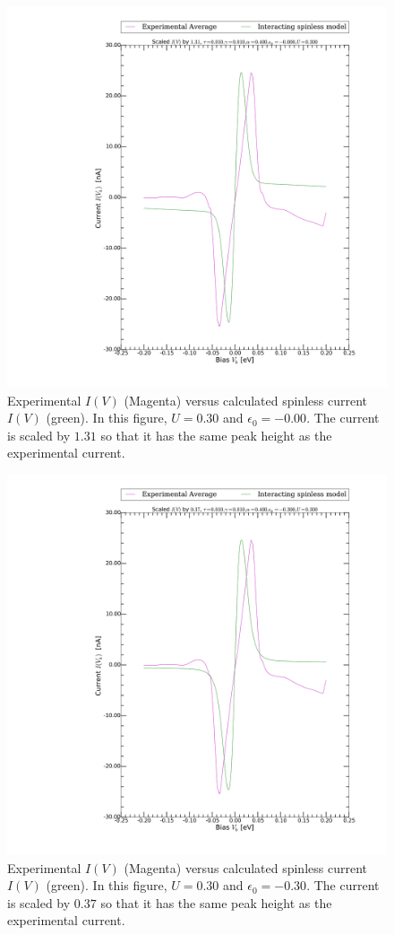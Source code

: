 \begin{figure}[h]
    \centering
    \includegraphics[width=.95\textwidth, clip=true, trim=11cm 2cm 2cm 0cm]{pdf/fit/fit_spinless_4.pdf}
    \caption{Experimental $I(V)$ (Magenta) versus calculated spinless current $I(V)$ (green). In this figure, $U=0.30$ and $\epsilon_0 = -0.00$. The current is scaled by $1.31$ so that it has the same peak height as the experimental current. }
    \label{fig:fitspinless4}
\end{figure}
\begin{figure}[h]
    \centering
    \includegraphics[width=.95\textwidth, clip=true, trim=11cm 2cm 2cm 0cm]{pdf/fit/fit_spinless_5.pdf}
    \caption{Experimental $I(V)$ (Magenta) versus calculated spinless current $I(V)$ (green). In this figure, $U=0.30$ and $\epsilon_0 = -0.30$. The current is scaled by $0.37$ so that it has the same peak height as the experimental current.}
    \label{fig:fitspinless5}
\end{figure}
